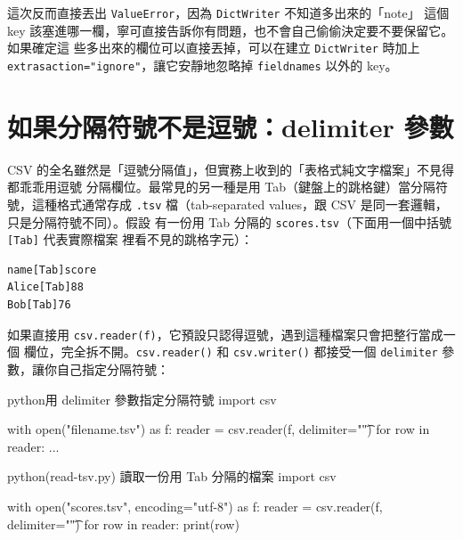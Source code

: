 
這次反而直接丟出 \texttt{ValueError}，因為 \texttt{DictWriter} 不知道多出來的「note」
這個 key 該塞進哪一欄，寧可直接告訴你有問題，也不會自己偷偷決定要不要保留它。如果確定這
些多出來的欄位可以直接丟掉，可以在建立 \texttt{DictWriter} 時加上
\texttt{extrasaction="ignore"}，讓它安靜地忽略掉 \texttt{fieldnames} 以外的 key。


\section{如果分隔符號不是逗號：delimiter 參數}
\label{sec:csv-delimiter}

CSV 的全名雖然是「逗號分隔值」，但實務上收到的「表格式純文字檔案」不見得都乖乖用逗號
分隔欄位。最常見的另一種是用 Tab（鍵盤上的跳格鍵）當分隔符號，這種格式通常存成
\texttt{.tsv} 檔（tab-separated values，跟 CSV 是同一套邏輯，只是分隔符號不同）。假設
有一份用 Tab 分隔的 \texttt{scores.tsv}（下面用一個中括號 \texttt{[Tab]} 代表實際檔案
裡看不見的跳格字元）：

\begin{verbatim}
name[Tab]score
Alice[Tab]88
Bob[Tab]76
\end{verbatim}

如果直接用 \texttt{csv.reader(f)}，它預設只認得逗號，遇到這種檔案只會把整行當成一個
欄位，完全拆不開。\texttt{csv.reader()} 和 \texttt{csv.writer()} 都接受一個
\texttt{delimiter} 參數，讓你自己指定分隔符號：

\begin{code}{python}{用 delimiter 參數指定分隔符號}
import csv

with open("filename.tsv") as f:
    reader = csv.reader(f, delimiter="\t")
    for row in reader:
        ...
\end{code}

\begin{example}{python}{(read-tsv.py) 讀取一份用 Tab 分隔的檔案}
import csv

with open("scores.tsv", encoding="utf-8") as f:
    reader = csv.reader(f, delimiter="\t")
    for row in reader:
        print(row)
\end{example}

